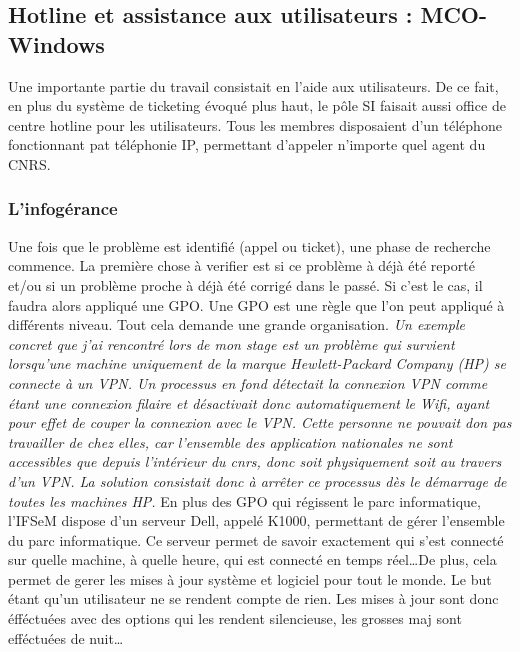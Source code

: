 \subsection{Hotline et assistance aux utilisateurs : MCO-Windows}
Une importante partie du travail consistait en l'aide aux utilisateurs. De ce fait, en plus du système de ticketing évoqué plus haut, le pôle SI faisait aussi office de centre hotline pour les utilisateurs. Tous les membres disposaient d'un téléphone fonctionnant pat téléphonie IP, permettant d'appeler n'importe quel agent du CNRS.

\subsubsection{L'infogérance}
Une fois que le problème est identifié (appel ou ticket), une phase de recherche commence. La première chose à verifier est si ce problème à déjà été reporté et/ou si un problème proche à déjà été corrigé dans le passé. Si c'est le cas, il faudra alors appliqué une GPO. Une GPO est une règle que l'on peut appliqué à différents niveau. Tout cela demande une grande organisation. 
\medbreak
\textit{Un exemple concret que j'ai rencontré lors de mon stage est un problème qui survient lorsqu'une machine uniquement de la marque Hewlett-Packard Company (HP) se connecte à un VPN. Un processus en fond détectait la connexion VPN comme étant une connexion filaire et désactivait donc automatiquement le Wifi, ayant pour effet de couper la connexion avec le VPN. Cette personne ne pouvait don pas travailler de chez elles, car l'ensemble des application nationales ne sont accessibles que depuis l'intérieur du cnrs, donc soit physiquement soit au travers d'un VPN. La solution consistait donc à arrêter ce processus dès le démarrage de toutes les machines HP.}
\medbreak
En plus des GPO qui régissent le parc informatique, l'IFSeM dispose d'un serveur Dell, appelé K1000, permettant de gérer l'ensemble du parc informatique. Ce serveur permet de savoir exactement qui s'est connecté sur quelle machine, à quelle heure, qui est connecté en temps réel\dots De plus, cela permet de gerer les mises à jour système et logiciel pour tout le monde. Le but étant qu'un utilisateur ne se rendent compte de rien. Les mises à jour sont donc éfféctuées avec des options qui les rendent silencieuse, les grosses maj sont efféctuées de nuit\dots 

\newpage

